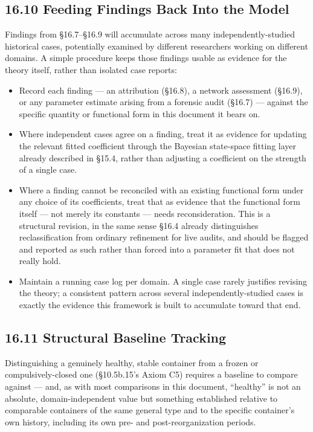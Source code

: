 \documentclass[
]{article}
\begin{document}
\hypertarget{feeding-findings-back-into-the-model}{%
\subsection{16.10 Feeding Findings Back Into the
Model}\label{feeding-findings-back-into-the-model}}

Findings from §16.7--§16.9 will accumulate across many
independently-studied historical cases, potentially examined by
different researchers working on different domains. A simple procedure
keeps those findings usable as evidence for the theory itself, rather
than isolated case reports:

\begin{itemize}
\item
  Record each finding --- an attribution (§16.8), a network assessment
  (§16.9), or any parameter estimate arising from a forensic audit
  (§16.7) --- against the specific quantity or functional form in this
  document it bears on.
\item
  Where independent cases agree on a finding, treat it as evidence for
  updating the relevant fitted coefficient through the Bayesian
  state-space fitting layer already described in §15.4, rather than
  adjusting a coefficient on the strength of a single case.
\item
  Where a finding cannot be reconciled with an existing functional form
  under any choice of its coefficients, treat that as evidence that the
  functional form itself --- not merely its constants --- needs
  reconsideration. This is a structural revision, in the same sense
  §16.4 already distinguishes reclassification from ordinary refinement
  for live audits, and should be flagged and reported as such rather
  than forced into a parameter fit that does not really hold.
\item
  Maintain a running case log per domain. A single case rarely justifies
  revising the theory; a consistent pattern across several
  independently-studied cases is exactly the evidence this framework is
  built to accumulate toward that end.
\end{itemize}

\hypertarget{structural-baseline-tracking}{%
\subsection{16.11 Structural Baseline
Tracking}\label{structural-baseline-tracking}}

Distinguishing a genuinely healthy, stable container from a frozen or
compulsively-closed one (§10.5b.15's Axiom C5) requires a baseline to
compare against --- and, as with most comparisons in this document,
``healthy'' is not an absolute, domain-independent value but something
established relative to comparable containers of the same general type
and to the specific container's own history, including its own pre- and
post-reorganization periods.
\end{document}
